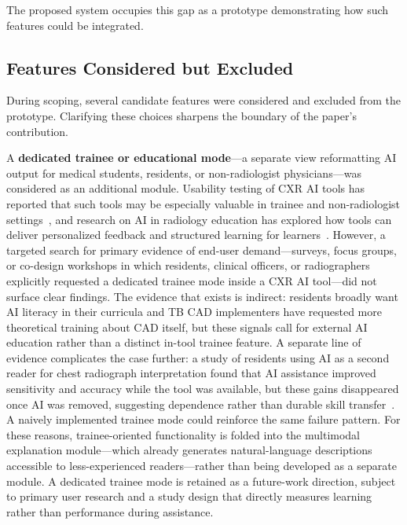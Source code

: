 \documentclass[conference, letterpaper]{IEEEtran}
\begin{document}
The proposed system occupies this gap as a prototype demonstrating how such features could be integrated.

\subsection{Features Considered but Excluded}

During scoping, several candidate features were considered and excluded from the prototype. Clarifying these choices sharpens the boundary of the paper's contribution.

A \textbf{dedicated trainee or educational mode}---a separate view reformatting AI output for medical students, residents, or non-radiologist physicians---was considered as an additional module. Usability testing of CXR AI tools has reported that such tools may be especially valuable in trainee and non-radiologist settings~\cite{cheung2022uai}, and research on AI in radiology education has explored how tools can deliver personalized feedback and structured learning for learners~\cite{chaves2023ai_radiology_education, mazurowski2019ai_precision_education}. However, a targeted search for primary evidence of end-user demand---surveys, focus groups, or co-design workshops in which residents, clinical officers, or radiographers explicitly requested a dedicated trainee mode inside a CXR AI tool---did not surface clear findings. The evidence that exists is indirect: residents broadly want AI literacy in their curricula and TB CAD implementers have requested more theoretical training about CAD itself, but these signals call for external AI education rather than a distinct in-tool trainee feature. A separate line of evidence complicates the case further: a study of residents using AI as a second reader for chest radiograph interpretation found that AI assistance improved sensitivity and accuracy while the tool was available, but these gains disappeared once AI was removed, suggesting dependence rather than durable skill transfer~\cite{chassagnon2023learning}. A naively implemented trainee mode could reinforce the same failure pattern. For these reasons, trainee-oriented functionality is folded into the multimodal explanation module---which already generates natural-language descriptions accessible to less-experienced readers---rather than being developed as a separate module. A dedicated trainee mode is retained as a future-work direction, subject to primary user research and a study design that directly measures learning rather than performance during assistance.
\end{document}
